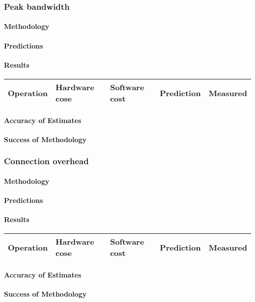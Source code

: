 \subsubsection{Peak bandwidth}



\paragraph{Methodology}
\paragraph{Predictions}
\paragraph{Results}

\begin{center}
\begin{tabular}{| l | l | l | l | l |}
\hline
Operation & Hardware cose & Software cost & Prediction & Measured \\
\hline
\end{tabular}
\end{center}

\paragraph{Accuracy of Estimates}
\paragraph{Success of Methodology}





\subsubsection{Connection overhead}
\paragraph{Methodology}
\paragraph{Predictions}
\paragraph{Results}

\begin{center}
\begin{tabular}{| l | l | l | l | l |}
\hline
Operation & Hardware cose & Software cost & Prediction & Measured \\
\hline
\end{tabular}
\end{center}

\paragraph{Accuracy of Estimates}
\paragraph{Success of Methodology}
